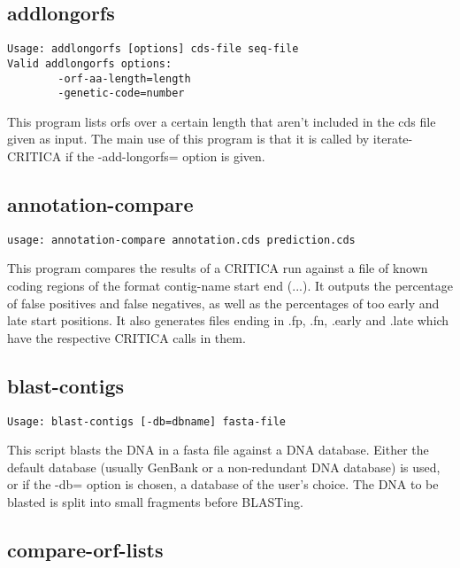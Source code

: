 \documentclass{article}
\begin{document}
\subsection{addlongorfs}

\begin{verbatim}
Usage: addlongorfs [options] cds-file seq-file 
Valid addlongorfs options:
        -orf-aa-length=length
        -genetic-code=number
\end{verbatim}

This program lists orfs over a certain length that aren't included in
the cds file given as input. The main use of this program is that it
is called by iterate-CRITICA if the -add-longorfs=
option is given.

\subsection{annotation-compare}

\begin{verbatim}
usage: annotation-compare annotation.cds prediction.cds
\end{verbatim}

This program compares the results of a CRITICA run against a file of
known coding regions of the format contig-name start end (...).
It outputs the percentage of false positives and false negatives, as
well as the percentages of too early and late start positions. It also
generates files ending in .fp, .fn, .early and
.late which have the respective CRITICA calls in them.

\subsection{blast-contigs}

\begin{verbatim}
Usage: blast-contigs [-db=dbname] fasta-file 
\end{verbatim}

This script blasts the DNA in a fasta file against a DNA
database. Either the default database (usually GenBank or a
non-redundant DNA database) is used, or if the -db= option is
chosen, a database of the user's choice. The DNA to be blasted is
split into small fragments before BLASTing.

\subsection{compare-orf-lists}
\end{document}
